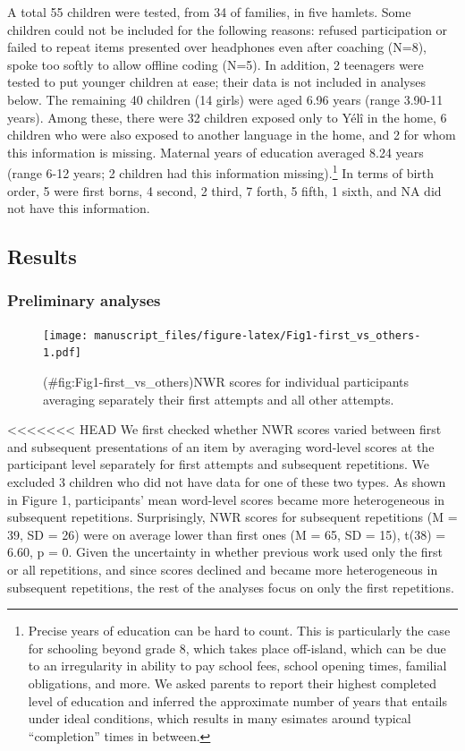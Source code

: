 \documentclass[english,,man,floatsintext]{apa6}
\begin{document}
A total 55 children were tested, from 34 of families, in five hamlets.
Some children could not be included for the following reasons: refused
participation or failed to repeat items presented over headphones even
after coaching (N=8), spoke too softly to allow offline coding (N=5). In
addition, 2 teenagers were tested to put younger children at ease; their
data is not included in analyses below. The remaining 40 children (14
girls) were aged 6.96 years (range 3.90-11 years). Among these, there
were 32 children exposed only to Yélî in the home, 6 children who were
also exposed to another language in the home, and 2 for whom this
information is missing. Maternal years of education averaged 8.24 years
(range 6-12 years; 2 children had this information missing).\footnote{Precise
  years of education can be hard to count. This is particularly the case
  for schooling beyond grade 8, which takes place off-island, which can
  be due to an irregularity in ability to pay school fees, school
  opening times, familial obligations, and more. We asked parents to
  report their highest completed level of education and inferred the
  approximate number of years that entails under ideal conditions, which
  results in many esimates around typical ``completion'' times in
  between.} In terms of birth order, 5 were first borns, 4 second, 2
third, 7 forth, 5 fifth, 1 sixth, and NA did not have this information.

\subsection{Results}\label{results}

\subsubsection{Preliminary analyses}\label{preliminary-analyses}

\begin{figure}
\centering
\texttt{[image: manuscript\_files/figure-latex/Fig1-first\_vs\_others-1.pdf]}
\caption{(\#fig:Fig1-first\_vs\_others)NWR scores for individual
participants averaging separately their first attempts and all other
attempts.}
\end{figure}

<<<<<<< HEAD
We first checked whether NWR scores varied between first and subsequent presentations of an item by averaging word-level scores at the participant level separately for first attempts and subsequent repetitions. We excluded 3 children who did not have data for one of these two types. As shown in Figure 1, participants' mean word-level scores became more heterogeneous in subsequent repetitions. Surprisingly, NWR scores for subsequent repetitions (M = 39, SD = 26)
were on average lower than first ones (M = 65, SD = 15), t(38) = 6.60, p = 0. Given the uncertainty in whether previous work used only the first or all repetitions, and since scores declined and became more heterogeneous in subsequent repetitions, the rest of the analyses focus on only the first repetitions.
\end{document}
